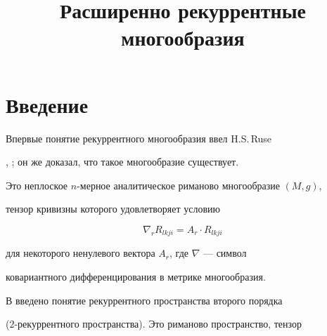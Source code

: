 \title{Расширенно рекуррентные многообразия} 


 


\date{} 




 


\pagestyle{plain} %


 


 




 


\maketitle 


\label{begin} 


 


\section{Введение} 


 


Впервые понятие рекуррентного многообразия ввел H.S.\,Ruse 


\cite{1}, \cite{2}; он же доказал, что такое многообразие существует. 


Это неплоское $n$-мерное аналитическое риманово многообразие $(M,g)$, 


тензор кривизны которого удовлетворяет условию 


\begin{equation} 


\nabla_r R_{lkji}=A_r\cdot R_{lkji} 


\end{equation} 


для некоторого ненулевого вектора $A_r$, где $\nabla$ --- символ 


ковариантного дифференцирования в метрике многообразия. 


 


В \cite{3} введено понятие рекуррентного пространства второго порядка 


($2$-рекуррентного пространства). Это риманово пространство, тензор 


